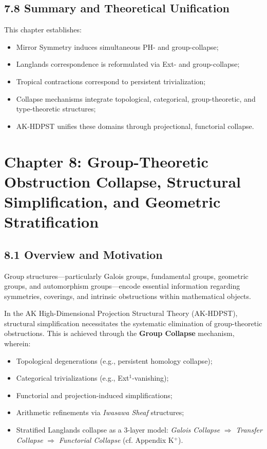 \documentclass[11pt]{article}
\begin{document}
\subsection*{7.8 Summary and Theoretical Unification}

This chapter establishes:

\begin{itemize}
    \item Mirror Symmetry induces simultaneous PH- and group-collapse;
    \item Langlands correspondence is reformulated via Ext- and group-collapse;
    \item Tropical contractions correspond to persistent trivialization;
    \item Collapse mechanisms integrate topological, categorical, group-theoretic, and type-theoretic structures;
    \item AK-HDPST unifies these domains through projectional, functorial collapse.
\end{itemize}



\section{Chapter 8: Group-Theoretic Obstruction Collapse, Structural Simplification, and Geometric Stratification}

\subsection*{8.1 Overview and Motivation}

Group structures—particularly Galois groups, fundamental groups, geometric groups, and automorphism groups—encode essential information regarding symmetries, coverings, and intrinsic obstructions within mathematical objects.

In the AK High-Dimensional Projection Structural Theory (AK-HDPST), structural simplification necessitates the systematic elimination of group-theoretic obstructions. This is achieved through the \textbf{Group Collapse} mechanism, wherein:

\begin{itemize}
    \item Topological degenerations (e.g., persistent homology collapse);
    \item Categorical trivializations (e.g., Ext$^1$-vanishing);
    \item Functorial and projection-induced simplifications;
    \item Arithmetic refinements via \emph{Iwasawa Sheaf} structures;
    \item Stratified Langlands collapse as a 3-layer model: \emph{Galois Collapse} $\Rightarrow$ \emph{Transfer Collapse} $\Rightarrow$ \emph{Functorial Collapse} (cf. Appendix K$^+$).
\end{itemize}
\end{document}
